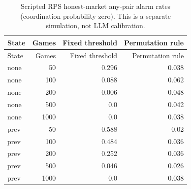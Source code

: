 \begin{longtable}{@{}lrrr@{}}
\caption{Scripted RPS honest-market any-pair alarm rates (coordination probability zero). This is a separate simulation, not LLM calibration.}\\
\toprule State & Games & Fixed threshold & Permutation rule\\\midrule\endfirsthead
\toprule State & Games & Fixed threshold & Permutation rule\\\midrule\endhead
\bottomrule\endfoot
none & 50 & 0.296 & 0.038\\
none & 100 & 0.088 & 0.062\\
none & 200 & 0.006 & 0.048\\
none & 500 & 0.0 & 0.042\\
none & 1000 & 0.0 & 0.038\\
prev & 50 & 0.588 & 0.02\\
prev & 100 & 0.484 & 0.036\\
prev & 200 & 0.252 & 0.036\\
prev & 500 & 0.046 & 0.026\\
prev & 1000 & 0.0 & 0.038\\
\end{longtable}\endgroup
